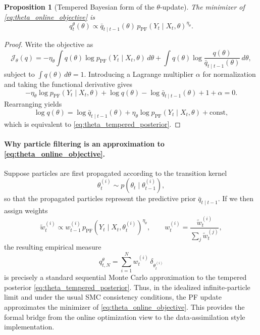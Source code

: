 \documentclass{article}
\newtheorem{proposition}{Proposition}
\begin{document}
\begin{proposition}[Tempered Bayesian form of the $\theta$-update]
\label{prop:theta_tempered_bayes}
The minimizer of \eqref{eq:theta_online_objective} is
\begin{equation}
q_t^\theta(\theta)
\propto
\bar q_{t\mid t-1}(\theta)\,
p_{\mathrm{PF}}(Y_t\mid X_t,\theta)^{\eta_\theta}.
\label{eq:theta_tempered_posterior}
\end{equation}
\end{proposition}

\begin{proof}
Write the objective as
\[
\mathcal J_\theta(q)
=
-\eta_\theta \int q(\theta)\log p_{\mathrm{PF}}(Y_t\mid X_t,\theta)\,d\theta
+
\int q(\theta)\log\frac{q(\theta)}{\bar q_{t\mid t-1}(\theta)}\,d\theta,
\]
subject to $\int q(\theta)\,d\theta=1$. Introducing a Lagrange multiplier $\alpha$ for normalization and taking the functional derivative gives
\[
-\eta_\theta \log p_{\mathrm{PF}}(Y_t\mid X_t,\theta)
+
\log q(\theta)-\log \bar q_{t\mid t-1}(\theta)
+1+\alpha
=0.
\]
Rearranging yields
\[
\log q(\theta)
=
\log \bar q_{t\mid t-1}(\theta)
+
\eta_\theta \log p_{\mathrm{PF}}(Y_t\mid X_t,\theta)
+\mathrm{const},
\]
which is equivalent to \eqref{eq:theta_tempered_posterior}.
\end{proof}

\paragraph{Why particle filtering is an approximation to \eqref{eq:theta_online_objective}.}
Suppose particles are first propagated according to the transition kernel
\begin{equation}
\theta_t^{(i)} \sim p(\theta_t\mid \theta_{t-1}^{(i)}),
\label{eq:theta_pf_propagation}
\end{equation}
so that the propagated particles represent the predictive prior $\bar q_{t\mid t-1}$. If we then assign weights
\begin{equation}
\widetilde w_t^{(i)}
\propto
w_{t-1}^{(i)}
\,p_{\mathrm{PF}}(Y_t\mid X_t,\theta_t^{(i)})^{\eta_\theta},
\qquad
w_t^{(i)}
=
\frac{\widetilde w_t^{(i)}}{\sum_j \widetilde w_t^{(j)}},
\label{eq:theta_pf_tempered_weights}
\end{equation}
the resulting empirical measure
\begin{equation}
q_{t,N}^\theta
=
\sum_{i=1}^N w_t^{(i)}\,\delta_{\theta_t^{(i)}}
\label{eq:theta_pf_empirical}
\end{equation}
is precisely a standard sequential Monte Carlo approximation to the tempered posterior \eqref{eq:theta_tempered_posterior}. Thus, in the idealized infinite-particle limit and under the usual SMC consistency conditions, the PF update approximates the minimizer of \eqref{eq:theta_online_objective}. This provides the formal bridge from the online optimization view to the data-assimilation style implementation.
\end{document}
